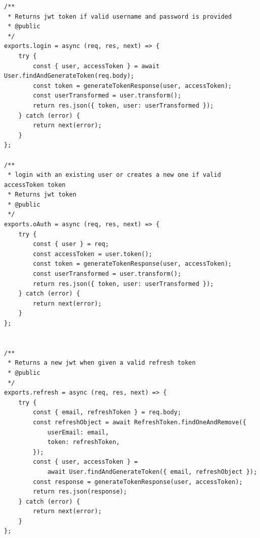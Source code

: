 \documentclass[12pt]{article}
\begin{document}
\begin{verbatim}
/**
 * Returns jwt token if valid username and password is provided
 * @public
 */
exports.login = async (req, res, next) => {
    try {
        const { user, accessToken } = await User.findAndGenerateToken(req.body);
        const token = generateTokenResponse(user, accessToken);
        const userTransformed = user.transform();
        return res.json({ token, user: userTransformed });
    } catch (error) {
        return next(error);
    }
};

/**
 * login with an existing user or creates a new one if valid accessToken token
 * Returns jwt token
 * @public
 */
exports.oAuth = async (req, res, next) => {
    try {
        const { user } = req;
        const accessToken = user.token();
        const token = generateTokenResponse(user, accessToken);
        const userTransformed = user.transform();
        return res.json({ token, user: userTransformed });
    } catch (error) {
        return next(error);
    }
};


/**
 * Returns a new jwt when given a valid refresh token
 * @public
 */
exports.refresh = async (req, res, next) => {
    try {
        const { email, refreshToken } = req.body;
        const refreshObject = await RefreshToken.findOneAndRemove({
            userEmail: email,
            token: refreshToken,
        });
        const { user, accessToken } = 
        	await User.findAndGenerateToken({ email, refreshObject });
        const response = generateTokenResponse(user, accessToken);
        return res.json(response);
    } catch (error) {
        return next(error);
    }
};
\end{verbatim}
\normalsize
\end{document}

